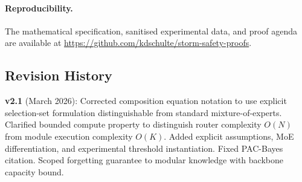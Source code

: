 \documentclass[11pt,a4paper]{article}
\begin{document}
\paragraph{Reproducibility.}
The mathematical specification, sanitised experimental data, and proof agenda are available at \url{https://github.com/kdschulte/storm-safety-proofs}.

\subsection*{Revision History}
\textbf{v2.1} (March 2026): Corrected composition equation notation to use explicit selection-set formulation distinguishable from standard mixture-of-experts. Clarified bounded compute property to distinguish router complexity $O(N)$ from module execution complexity $O(K)$. Added explicit assumptions, MoE differentiation, and experimental threshold instantiation. Fixed PAC-Bayes citation. Scoped forgetting guarantee to modular knowledge with backbone capacity bound.
\end{document}
